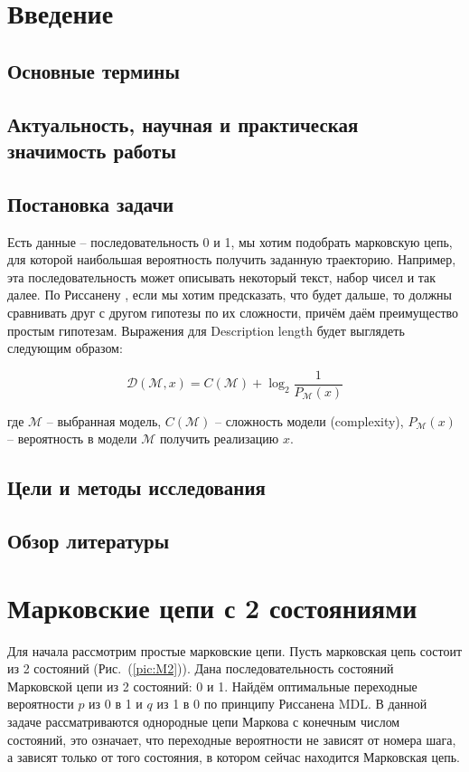 \documentclass[12pt]{article}
\begin{document}
	
	\newpage
	
	\tableofcontents %
	
	\newpage
	
	\section{Введение}
	\subsection*{Основные термины}
	\subsection*{Актуальность, научная и практическая значимость работы}
	\subsection*{Постановка задачи}
	 Есть данные -- последовательность 0 и 1, мы хотим подобрать марковскую цепь, для которой наибольшая вероятность получить заданную траекторию. Например, эта последовательность может описывать некоторый текст, набор чисел и так далее. По Риссанену \cite{rissanen}, если мы хотим предсказать, что будет дальше, то должны сравнивать друг с другом гипотезы по их сложности, причём даём преимущество простым гипотезам. Выражения для Description length будет выглядеть следующим образом:
	
	\begin{equation}\label{eq:rissanenDL}\mathcal{D}(\mathcal{M},x) = C(\mathcal{M})+\log_2{\frac{1}{P_{\mathcal{M}}(x)}}\end{equation}
	
	где $\mathcal{M}$ -- выбранная модель, $C(\mathcal{M})$ -- сложность модели (complexity), $P_{\mathcal{M}}(x)$ -- вероятность в модели $\mathcal{M}$ получить реализацию $x$.
	
	\subsection*{Цели и методы исследования}
	
	\subsection*{Обзор литературы}
	
	\section{Марковские цепи с 2 состояниями}
	Для начала рассмотрим простые марковские цепи. Пусть марковская цепь состоит из 2 состояний (Рис.~(\ref{pic:M2})). Дана последовательность состояний Марковской цепи из 2 состояний: 0 и 1. Найдём оптимальные переходные вероятности $p$ из 0 в 1 и $q$ из 1 в 0 по принципу Риссанена MDL. В данной задаче рассматриваются однородные цепи Маркова с конечным числом состояний, это означает, что переходные вероятности не зависят от номера шага, а зависят только от того состояния, в котором сейчас находится Марковская цепь. 
	
\end{document}

